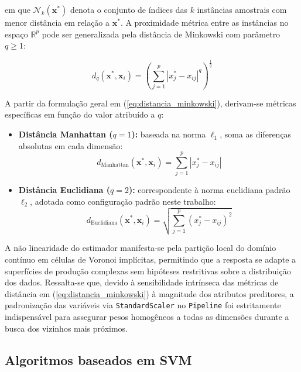 \noindent em que $\mathcal{N}_k(\mathbf{x}^*)$ denota o conjunto de índices das $k$ instâncias amostrais com menor distância em relação a $\mathbf{x}^*$. A proximidade métrica entre as instâncias no espaço $\mathbb{R}^p$ pode ser generalizada pela distância de Minkowski com parâmetro $q \ge 1$:

\begin{equation}
d_q(\mathbf{x}^*, \mathbf{x}_i) = \left( \sum_{j=1}^{p} |x^*_j - x_{ij}|^q \right)^{\frac{1}{q}} \label{eq:distancia_minkowski}
\end{equation}

A partir da formulação geral em (\ref{eq:distancia_minkowski}), derivam-se métricas específicas em função do valor atribuído a $q$:
\begin{itemize}
    \item \textbf{Distância Manhattan ($q = 1$):} baseada na norma $\ell_1$, soma as diferenças absolutas em cada dimensão:
    \begin{equation}
    d_{\text{Manhattan}}(\mathbf{x}^*, \mathbf{x}_i) = \sum_{j=1}^{p} |x^*_j - x_{ij}| \label{eq:distancia_manhattan}
    \end{equation}
    
    \item \textbf{Distância Euclidiana ($q = 2$):} correspondente à norma euclidiana padrão $\ell_2$, adotada como configuração padrão neste trabalho:
    \begin{equation}
    d_{\text{Euclidiana}}(\mathbf{x}^*, \mathbf{x}_i) = \sqrt{\sum_{j=1}^{p} (x^*_j - x_{ij})^2} \label{eq:distancia_euclidiana}
    \end{equation}
\end{itemize}

A não linearidade do estimador manifesta-se pela partição local do domínio contínuo em células de Voronoi implícitas, permitindo que a resposta se adapte a superfícies de produção complexas sem hipóteses restritivas sobre a distribuição dos dados. Ressalta-se que, devido à sensibilidade intrínseca das métricas de distância em (\ref{eq:distancia_minkowski}) à magnitude dos atributos preditores, a padronização das variáveis via \texttt{StandardScaler} no \texttt{Pipeline} foi estritamente indispensável para assegurar pesos homogêneos a todas as dimensões durante a busca dos vizinhos mais próximos.

\subsection{Algoritmos baseados em \gls{SVM}}

